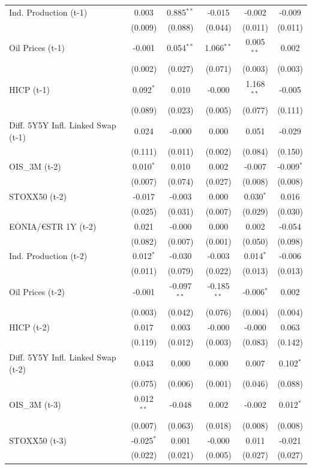 \begin{longtable}[t]{lccccc}
Ind. Production (t-1) & 0.003 & 0.885$^{**}$ & -0.015 & -0.002 & -0.009\\
 & (0.009) & (0.088) & (0.044) & (0.011) & (0.011)\\
Oil Prices (t-1) & -0.001 & 0.054$^{**}$ & 1.066$^{**}$ & 0.005$^{**}$ & 0.002\\
 & (0.002) & (0.027) & (0.071) & (0.003) & (0.003)\\
HICP (t-1) & 0.092$^{*}$ & 0.010 & -0.000 & 1.168$^{**}$ & -0.005\\
 & (0.089) & (0.023) & (0.005) & (0.077) & (0.111)\\
Diff. 5Y5Y Infl. Linked Swap (t-1) & 0.024 & -0.000 & 0.000 & 0.051 & -0.029\\
 & (0.111) & (0.011) & (0.002) & (0.084) & (0.150)\\
OIS\_3M (t-2) & 0.010$^{*}$ & 0.010 & 0.002 & -0.007 & -0.009$^{*}$\\
 & (0.007) & (0.074) & (0.027) & (0.008) & (0.008)\\
STOXX50 (t-2) & -0.017 & -0.003 & 0.000 & 0.030$^{*}$ & 0.016\\
 & (0.025) & (0.031) & (0.007) & (0.029) & (0.030)\\
EONIA/€STR 1Y (t-2) & 0.021 & -0.000 & 0.000 & 0.002 & -0.054\\
 & (0.082) & (0.007) & (0.001) & (0.050) & (0.098)\\
Ind. Production (t-2) & 0.012$^{*}$ & -0.030 & -0.003 & 0.014$^{*}$ & -0.006\\
 & (0.011) & (0.079) & (0.022) & (0.013) & (0.013)\\
Oil Prices (t-2) & -0.001 & -0.097$^{**}$ & -0.185$^{**}$ & -0.006$^{*}$ & 0.002\\
 & (0.003) & (0.042) & (0.076) & (0.004) & (0.004)\\
HICP (t-2) & 0.017 & 0.003 & -0.000 & -0.000 & 0.063\\
 & (0.119) & (0.012) & (0.003) & (0.083) & (0.142)\\
Diff. 5Y5Y Infl. Linked Swap (t-2) & 0.043 & 0.000 & 0.000 & 0.007 & 0.102$^{*}$\\
 & (0.075) & (0.006) & (0.001) & (0.046) & (0.088)\\
OIS\_3M (t-3) & 0.012$^{**}$ & -0.048 & 0.002 & -0.002 & 0.012$^{*}$\\
 & (0.007) & (0.063) & (0.018) & (0.008) & (0.008)\\
STOXX50 (t-3) & -0.025$^{*}$ & 0.001 & -0.000 & 0.011 & -0.021\\
 & (0.022) & (0.021) & (0.005) & (0.027) & (0.027)\\

\end{longtable}
